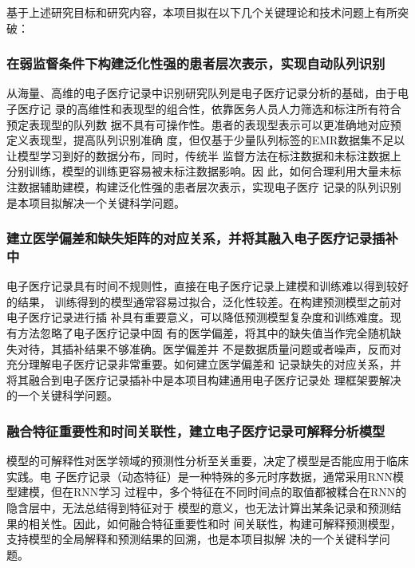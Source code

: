 基于上述研究目标和研究内容，本项目拟在以下几个关键理论和技术问题上有所突破：

\subsubsection{在弱监督条件下构建泛化性强的患者层次表示，实现自动队列识别}

从海量、高维的电子医疗记录中识别研究队列是电子医疗记录分析的基础，由于电子医疗记
录的高维性和表现型的组合性，依靠医务人员人力筛选和标注所有符合预定表现型的队列数
据不具有可操作性。患者的表现型表示可以更准确地对应预定义表现型，提高队列识别准确
度，但仅基于少量队列标签的EMR数据集不足以让模型学习到好的数据分布，同时，传统半
监督方法在标注数据和未标注数据上分别训练，模型的训练更容易被未标注数据影响。因
此，如何合理利用大量未标注数据辅助建模，构建泛化性强的患者层次表示，实现电子医疗
记录的队列识别是本项目拟解决一个关键科学问题。

\subsubsection{建立医学偏差和缺失矩阵的对应关系，并将其融入电子医疗记录插补中}

电子医疗记录具有时间不规则性，直接在电子医疗记录上建模和训练难以得到较好的结果，
训练得到的模型通常容易过拟合，泛化性较差。在构建预测模型之前对电子医疗记录进行插
补具有重要意义，可以降低预测模型复杂度和训练难度。现有方法忽略了电子医疗记录中固
有的医学偏差，将其中的缺失值当作完全随机缺失对待，其插补结果不够准确。医学偏差并
不是数据质量问题或者噪声，反而对充分理解电子医疗记录非常重要。如何建立医学偏差和
记录缺失的对应关系，并将其融合到电子医疗记录插补中是本项目构建通用电子医疗记录处
理框架要解决的一个关键科学问题。

\subsubsection{融合特征重要性和时间关联性，建立电子医疗记录可解释分析模型}

模型的可解释性对医学领域的预测性分析至关重要，决定了模型是否能应用于临床实践。电
子医疗记录（动态特征）是一种特殊的多元时序数据，通常采用RNN模型建模，但在RNN学习
过程中，多个特征在不同时间点的取值都被糅合在RNN的隐含层中，无法总结得到特征对于
模型的意义，也无法计算出某条记录和预测结果的相关性。因此，如何融合特征重要性和时
间关联性，构建可解释预测模型，支持模型的全局解释和预测结果的回溯，也是本项目拟解
决的一个关键科学问题。